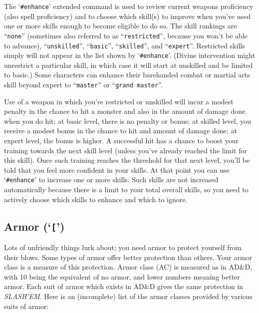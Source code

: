 The `{\tt \#enhance}' extended command is used to review current weapons proficiency
(also spell proficiency) and to choose which skill(s) to improve when
you've used one or more skills enough to become eligible to do so.  The
skill rankings are ``{\tt none}'' (sometimes also referred to as ``{\tt restricted}'',
because you won't be able to advance), ``{\tt unskilled}'', ``{\tt basic}'', ``{\tt skilled}'',
and ``{\tt expert}''.  Restricted skills simply will not appear in the list
shown by `{\tt \#enhance}'.  (Divine intervention might unrestrict a particular
skill, in which case it will start at unskilled and be limited to basic.)
Some characters can enhance their barehanded combat or martial arts skill
beyond expert to ``{\tt master}'' or ``{\tt grand master}''.

Use of a weapon in which you're restricted or unskilled
will incur a modest penalty in the chance to hit a monster and also in
the amount of damage done when you do hit; at basic level, there is no
penalty or bonus; at skilled level, you receive a modest bonus in the
chance to hit and amount of damage done; at expert level, the bonus is
higher.  A successful hit has a chance to boost your training towards
the next skill level (unless you've already reached the limit for this
skill).  Once such training reaches the threshold for that next level,
you'll be told that you feel more confident in your skills.  At that
point you can use `{\tt \#enhance}' to increase one or more skills.  Such skills
are not increased automatically because there is a limit to your total
overall skills, so you need to actively choose which skills to enhance
and which to ignore.
\subsection*{Armor (`{\tt [}')}


Lots of unfriendly things lurk about; you need armor to protect
yourself from their blows.  Some types of armor offer better
protection than others.  Your armor class is a measure of this
protection.  Armor class (AC) is measured as in AD\&D, with 10 being
the equivalent of no armor, and lower numbers meaning better armor.
Each suit of armor which exists in AD\&D gives the same protection in
{\it SLASH'EM}.  Here is an (incomplete) list of the armor classes provided by
various suits of armor:

